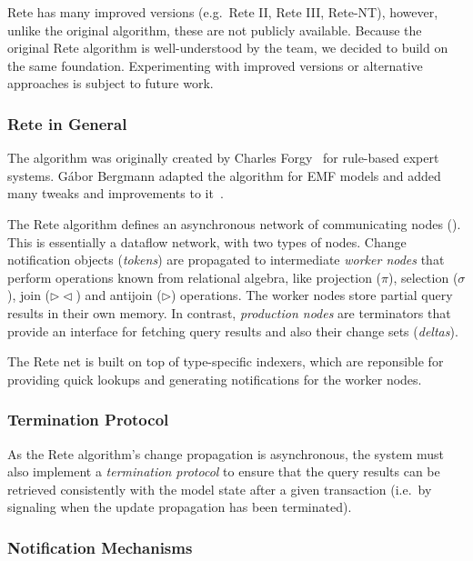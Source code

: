 Rete has many improved versions (e.g.\ Rete II, Rete III, Rete-NT), however, unlike the original algorithm, these are not publicly available. Because the original Rete algorithm is well-understood by the \eiq{} team, we decided to build \iqd{} on the same foundation. Experimenting with improved versions or alternative approaches is subject to future work.

\subsubsection{Rete in General}

The algorithm was originally created by Charles Forgy~\cite{Forgy} for rule-based expert systems. Gábor Bergmann  adapted the algorithm for EMF models and added many tweaks and improvements to it~\cite{BergmannMasters}.


The Rete algorithm defines an asynchronous network of communicating nodes (). This is essentially a dataflow network, with two types of nodes. Change notification objects (\emph{tokens}) are propagated to intermediate \emph{worker nodes} that perform operations known from relational algebra, like projection ($ \pi $), selection ($ \sigma $),  join ($ \rhd\!\!\lhd $) and antijoin ($ \rhd $) operations. The worker nodes store partial query results in their own memory. In contrast, \emph{production nodes} are terminators that provide an interface for fetching query results and also their change sets (\emph{deltas}).

The Rete net is built on top of type-specific indexers, which are reponsible for providing quick lookups and generating notifications for the worker nodes.

\subsubsection{Termination Protocol}

As the Rete algorithm's change propagation is asynchronous, the system must also implement a \emph{termination protocol} to ensure that the query results can be retrieved consistently with the model state after a given transaction (i.e.\ by signaling when the update propagation has been terminated).

\subsubsection{Notification Mechanisms}
\label{notifications}


